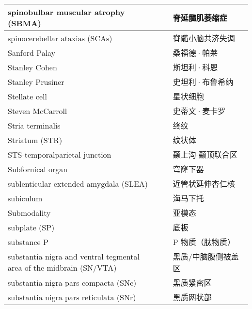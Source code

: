 \begin{longtable}{lll}
	\midrule
	spinobulbar muscular atrophy (SBMA)   && 脊延髓肌萎缩症 \\
	
	\midrule
	spinocerebellar ataxias (SCAs)   && 脊髓小脑共济失调 \\
	
	\midrule
	Sanford Palay   && 桑福德·帕莱 \\
	
	\midrule
	Stanley Cohen   && 斯坦利·科恩 \\
	
	\midrule
	Stanley Prusiner   && 史坦利·布鲁希纳 \\
	
	\midrule
	Stellate cell   && 星状细胞 \\
	
	\midrule
	Steven McCarroll   && 史蒂文·麦卡罗 \\
	
	\midrule
	Stria terminalis  && 终纹 \\
	
	\midrule
	Striatum (STR)  && 纹状体 \\
	
	\midrule
	STS-temporalparietal junction   && 颞上沟-颞顶联合区 \\
	
	\midrule
	Subfornical organ   && 穹窿下器 \\
	
	\midrule
	sublenticular extended amygdala (SLEA)   && 近管状延伸杏仁核 \\
	
	\midrule
	subiculum   && 海马下托 \\
	
	\midrule
	Submodality   && 亚模态 \\
	
	\midrule
	subplate (SP)   && 底板 \\
	
	\midrule
	substance P   && P 物质（肽物质） \\
	
	\midrule
	\makecell{substantia nigra and ventral tegmental \\area of the midbrain (SN/VTA)}   && 黑质/中脑腹侧被盖区 \\
	
	\midrule
	substantia nigra pars compacta (SNc)  && 黑质紧密区 \\
	
	\midrule
	substantia nigra pars reticulata (SNr)  && 黑质网状部 \\
	

\end{longtable}
